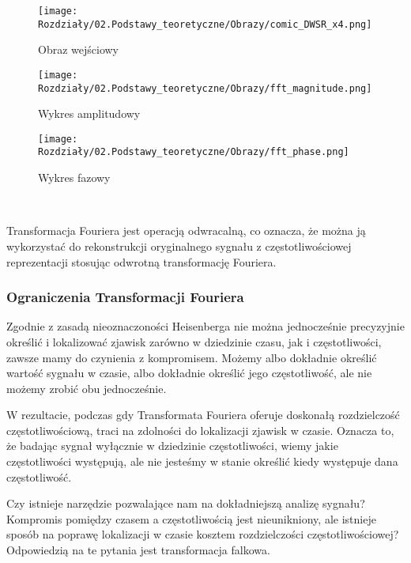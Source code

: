 \begin{figure}[ht]
    \centering
    \begin{minipage}[t]{0.325\linewidth}
        \texttt{[image: Rozdziały/02.Podstawy\_teoretyczne/Obrazy/comic\_DWSR\_x4.png]}
        \caption{Obraz wejściowy}
        \label{fig:image24}
    \end{minipage}
    \begin{minipage}[t]{0.325\linewidth}
        \texttt{[image: Rozdziały/02.Podstawy\_teoretyczne/Obrazy/fft\_magnitude.png]}
        \caption{Wykres amplitudowy}
        \label{fig:image25}
    \end{minipage}
    \begin{minipage}[t]{0.325\linewidth}
        \texttt{[image: Rozdziały/02.Podstawy\_teoretyczne/Obrazy/fft\_phase.png]}
        \caption{Wykres fazowy}
        \label{fig:image26}
    \end{minipage}
\end{figure}\

Transformacja Fouriera jest operacją odwracalną, co oznacza, że można ją wykorzystać do rekonstrukcji oryginalnego sygnału z częstotliwościowej reprezentacji stosując odwrotną transformację Fouriera.


\subsubsection{Ograniczenia Transformacji Fouriera}

Zgodnie z zasadą nieoznaczoności Heisenberga nie można jednocześnie precyzyjnie określić i lokalizować zjawisk zarówno w dziedzinie czasu, jak i częstotliwości, zawsze mamy do czynienia z kompromisem. 
Możemy albo dokładnie określić wartość sygnału w czasie, albo dokładnie określić jego częstotliwość, ale nie możemy zrobić obu jednocześnie.

W rezultacie, podczas gdy Transformata Fouriera oferuje doskonałą rozdzielczość częstotliwościową, traci na zdolności do lokalizacji zjawisk w czasie. Oznacza to, że badając sygnał wyłącznie w dziedzinie częstotliwości, wiemy jakie częstotliwości występują, ale nie jesteśmy w stanie określić kiedy występuje dana częstotliwość.

Czy istnieje narzędzie pozwalające nam na dokładniejszą analizę sygnału? Kompromis pomiędzy czasem a częstotliwością jest nieunikniony, ale istnieje sposób na poprawę lokalizacji w czasie kosztem rozdzielczości częstotliwościowej? Odpowiedzią na te pytania jest transformacja falkowa.


